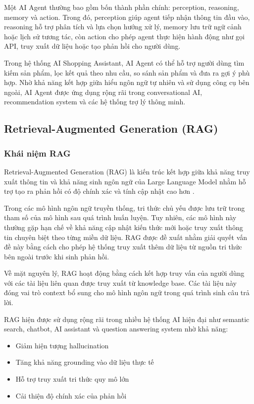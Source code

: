 Một AI Agent thường bao gồm bốn thành phần chính: perception, reasoning, memory và action. Trong đó, perception giúp agent tiếp nhận thông tin đầu vào, reasoning hỗ trợ phân tích và lựa chọn hướng xử lý, memory lưu trữ ngữ cảnh hoặc lịch sử tương tác, còn action cho phép agent thực hiện hành động như gọi API, truy xuất dữ liệu hoặc tạo phản hồi cho người dùng.

Trong hệ thống AI Shopping Assistant, AI Agent có thể hỗ trợ người dùng tìm kiếm sản phẩm, lọc kết quả theo nhu cầu, so sánh sản phẩm và đưa ra gợi ý phù hợp. Nhờ khả năng kết hợp giữa hiểu ngôn ngữ tự nhiên và sử dụng công cụ bên ngoài, AI Agent được ứng dụng rộng rãi trong conversational AI, recommendation system và các hệ thống trợ lý thông minh.
\subsection{Retrieval-Augmented Generation (RAG)}
\subsubsection{Khái niệm RAG}

Retrieval-Augmented Generation (RAG) là kiến trúc kết hợp giữa khả năng truy xuất thông tin và khả năng sinh ngôn ngữ của Large Language Model nhằm hỗ trợ tạo ra phản hồi có độ chính xác và tính cập nhật cao hơn \parencite{lewis2020rag}.

Trong các mô hình ngôn ngữ truyền thống, tri thức chủ yếu được lưu trữ trong tham số của mô hình sau quá trình huấn luyện. Tuy nhiên, các mô hình này thường gặp hạn chế về khả năng cập nhật kiến thức mới hoặc truy xuất thông tin chuyên biệt theo từng miền dữ liệu. RAG được đề xuất nhằm giải quyết vấn đề này bằng cách cho phép hệ thống truy xuất thêm dữ liệu từ nguồn tri thức bên ngoài trước khi sinh phản hồi.

Về mặt nguyên lý, RAG hoạt động bằng cách kết hợp truy vấn của người dùng với các tài liệu liên quan được truy xuất từ knowledge base. Các tài liệu này đóng vai trò context bổ sung cho mô hình ngôn ngữ trong quá trình sinh câu trả lời.

RAG hiện được sử dụng rộng rãi trong nhiều hệ thống AI hiện đại như semantic search, chatbot, AI assistant và question answering system nhờ khả năng:
\begin{itemize}
    \item Giảm hiện tượng hallucination
    
    \item Tăng khả năng grounding vào dữ liệu thực tế
    
    \item Hỗ trợ truy xuất tri thức quy mô lớn
    
    \item Cải thiện độ chính xác của phản hồi
\end{itemize}


